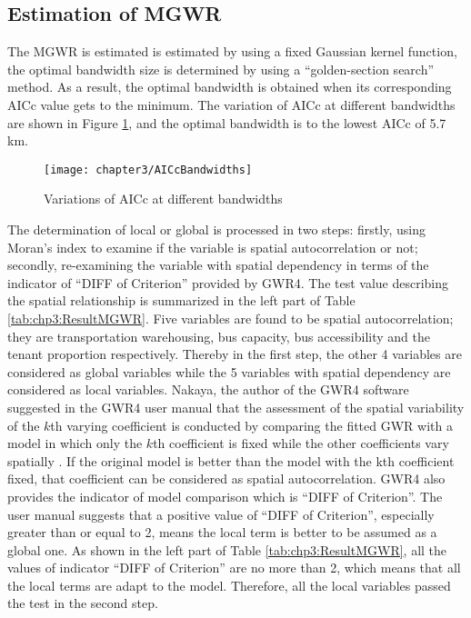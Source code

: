 \subsection{Estimation of MGWR}
%
The MGWR is estimated is estimated by using a fixed Gaussian kernel function,  the optimal bandwidth size is determined by using a “golden-section search” method. As a result, the optimal bandwidth is obtained when its corresponding AICc value gets to the minimum. The variation of AICc at different bandwidths are shown in Figure \ref{fig:chp3:AICcBandwidths}, and the optimal bandwidth is to the lowest AICc of 5.7 km.

\begin{figure}[htbp]
	\centering
	\texttt{[image: chapter3/AICcBandwidths]}
	\caption{Variations of AICc at different bandwidths}
	\label{fig:chp3:AICcBandwidths}
\end{figure}

The determination of local or global is processed in two steps: firstly, using Moran’s index to examine if the variable is spatial autocorrelation or not; secondly, re-examining the variable with spatial dependency in terms of the indicator of “DIFF of Criterion” provided by GWR4. The test value describing the spatial relationship is summarized in the left part of Table \ref{tab:chp3:ResultMGWR}. Five variables are found to be spatial autocorrelation; they are transportation warehousing, bus capacity, bus accessibility and the tenant proportion respectively. Thereby in the first step, the other 4 variables are considered as global variables while the 5 variables with spatial dependency are considered as local variables. Nakaya, the author of the GWR4 software suggested in the GWR4 user manual that the assessment of the spatial variability of the $k$th varying coefficient is conducted by comparing the fitted GWR with a model in which only the $k$th coefficient is fixed while the other coefficients vary spatially \cite{nakaya2014gwr4}. If the original model is better than the model with the kth coefficient fixed, that coefficient can be considered as spatial autocorrelation. GWR4 also provides the indicator of model comparison which is “DIFF of Criterion”. The user manual suggests that a positive value of “DIFF of Criterion”, especially greater than or equal to 2, means the local term is better to be assumed as a global one. As shown in the left part of Table \ref{tab:chp3:ResultMGWR}, all the values of indicator “DIFF of Criterion” are no more than 2, which means that all the local terms are adapt to the model. Therefore, all the local variables passed the test in the second step.

